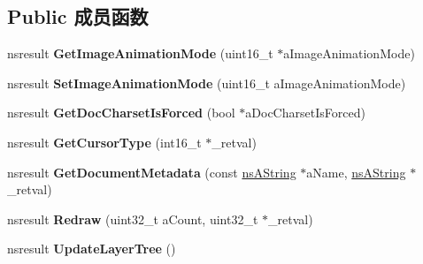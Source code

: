 \subsection*{Public 成员函数}
\begin{DoxyCompactItemize}
\item 
\mbox{\label{interfacens_i_d_o_m_window_utils_a7cc631562660d1e16111449010bcde19}} 
nsresult {\bfseries Get\+Image\+Animation\+Mode} (uint16\+\_\+t $\ast$a\+Image\+Animation\+Mode)
\item 
\mbox{\label{interfacens_i_d_o_m_window_utils_a917c93bf8517cb884c563adf0c2a6bf2}} 
nsresult {\bfseries Set\+Image\+Animation\+Mode} (uint16\+\_\+t a\+Image\+Animation\+Mode)
\item 
\mbox{\label{interfacens_i_d_o_m_window_utils_a5303a2eb0c0d1e60d1b5a092e75bb1ed}} 
nsresult {\bfseries Get\+Doc\+Charset\+Is\+Forced} (bool $\ast$a\+Doc\+Charset\+Is\+Forced)
\item 
\mbox{\label{interfacens_i_d_o_m_window_utils_af758dfa60e6cc2f98e2003c6efe40c4d}} 
nsresult {\bfseries Get\+Cursor\+Type} (int16\+\_\+t $\ast$\+\_\+retval)
\item 
\mbox{\label{interfacens_i_d_o_m_window_utils_a3e71ed235f1263230534831b5d0208bf}} 
nsresult {\bfseries Get\+Document\+Metadata} (const \hyperlink{structns_string_container}{ns\+A\+String} $\ast$a\+Name, \hyperlink{structns_string_container}{ns\+A\+String} $\ast$\+\_\+retval)
\item 
\mbox{\label{interfacens_i_d_o_m_window_utils_ae483caf7b4c4c02523fc16ad328c55b9}} 
nsresult {\bfseries Redraw} (uint32\+\_\+t a\+Count, uint32\+\_\+t $\ast$\+\_\+retval)
\item 
\mbox{\label{interfacens_i_d_o_m_window_utils_a05e148ec9748ec574a29f0ca8ff3403b}} 
nsresult {\bfseries Update\+Layer\+Tree} ()
\item 
\mbox{\label{interfacens_i_d_o_m_window_utils_a69ebed0d29dc02aa46289e83c4636f5f}} 

\end{DoxyCompactItemize}
